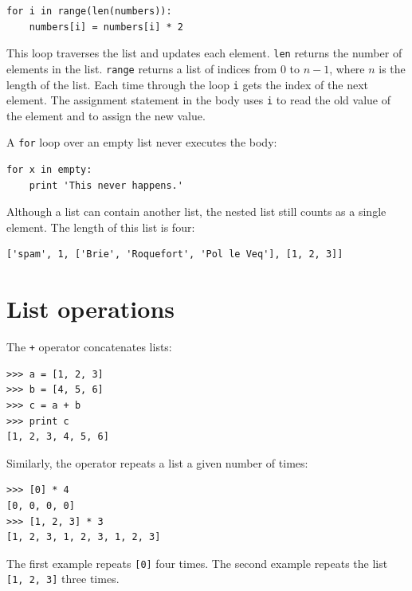 \documentclass[10pt]{book}
\begin{document}

\beforeverb
\begin{verbatim}
for i in range(len(numbers)):
    numbers[i] = numbers[i] * 2
\end{verbatim}
\afterverb
%
This loop traverses the list and updates each element.  {\tt len}
returns the number of elements in the list.  {\tt range} returns
a list of indices from 0 to $n-1$, where $n$ is the length of
the list.  Each time through the loop {\tt i} gets the index
of the next element.  The assignment statement in the body uses
{\tt i} to read the old value of the element and to assign the
new value.


A {\tt for} loop over an empty list never executes the body:

\beforeverb
\begin{verbatim}
for x in empty:
    print 'This never happens.'
\end{verbatim}
\afterverb
%
Although a list can contain another list, the nested
list still counts as a single element.  The length of this list is
four:


\beforeverb
\begin{verbatim}
['spam', 1, ['Brie', 'Roquefort', 'Pol le Veq'], [1, 2, 3]]
\end{verbatim}
\afterverb



\section{List operations}

The {\tt +} operator concatenates lists:


\beforeverb
\begin{verbatim}
>>> a = [1, 2, 3]
>>> b = [4, 5, 6]
>>> c = a + b
>>> print c
[1, 2, 3, 4, 5, 6]
\end{verbatim}
\afterverb
%
Similarly, the {\tt *} operator repeats a list a given number of times:


\beforeverb
\begin{verbatim}
>>> [0] * 4
[0, 0, 0, 0]
>>> [1, 2, 3] * 3
[1, 2, 3, 1, 2, 3, 1, 2, 3]
\end{verbatim}
\afterverb
%
The first example repeats {\tt [0]} four times.  The second example
repeats the list {\tt [1, 2, 3]} three times.
\end{document}
